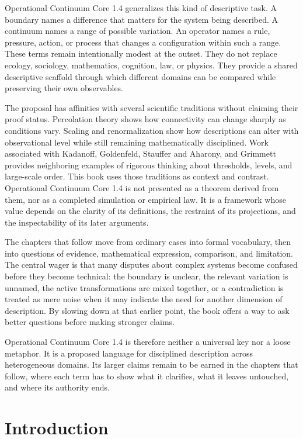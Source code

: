 \documentclass[11pt,a4paper,openany]{book}
\begin{document}
Operational Continuum Core 1.4 generalizes this kind of descriptive task. A boundary names a difference that matters for the system being described. A continuum names a range of possible variation. An operator names a rule, pressure, action, or process that changes a configuration within such a range. These terms remain intentionally modest at the outset. They do not replace ecology, sociology, mathematics, cognition, law, or physics. They provide a shared descriptive scaffold through which different domains can be compared while preserving their own observables.\par
The proposal has affinities with several scientific traditions without claiming their proof status. Percolation theory shows how connectivity can change sharply as conditions vary. Scaling and renormalization show how descriptions can alter with observational level while still remaining mathematically disciplined. Work associated with Kadanoff, Goldenfeld, Stauffer and Aharony, and Grimmett provides neighboring examples of rigorous thinking about thresholds, levels, and large-scale order. This book uses those traditions as context and contrast. Operational Continuum Core 1.4 is not presented as a theorem derived from them, nor as a completed simulation or empirical law. It is a framework whose value depends on the clarity of its definitions, the restraint of its projections, and the inspectability of its later arguments.\par
The chapters that follow move from ordinary cases into formal vocabulary, then into questions of evidence, mathematical expression, comparison, and limitation. The central wager is that many disputes about complex systems become confused before they become technical: the boundary is unclear, the relevant variation is unnamed, the active transformations are mixed together, or a contradiction is treated as mere noise when it may indicate the need for another dimension of description. By slowing down at that earlier point, the book offers a way to ask better questions before making stronger claims.\par
Operational Continuum Core 1.4 is therefore neither a universal key nor a loose metaphor. It is a proposed language for disciplined description across heterogeneous domains. Its larger claims remain to be earned in the chapters that follow, where each term has to show what it clarifies, what it leaves untouched, and where its authority ends.\par
\section{Introduction}
\end{document}

